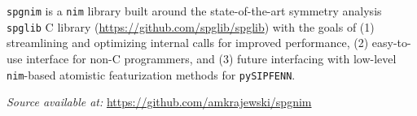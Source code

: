 \texttt{spgnim} is a \texttt{nim} library built around the state-of-the-art symmetry analysis \texttt{spglib} C library (\href{https://github.com/spglib/spglib}{https://github.com/spglib/spglib}) with the goals of (1) streamlining and optimizing internal calls for improved performance, (2) easy-to-use interface for non-C programmers, and (3) future interfacing with low-level \texttt{nim}-based atomistic featurization methods for \texttt{pySIPFENN}.

\hspace{24pt} 
\textit{Source available at:} 
\href{https://github.com/amkrajewski/spgnim}{https://github.com/amkrajewski/spgnim}



 
